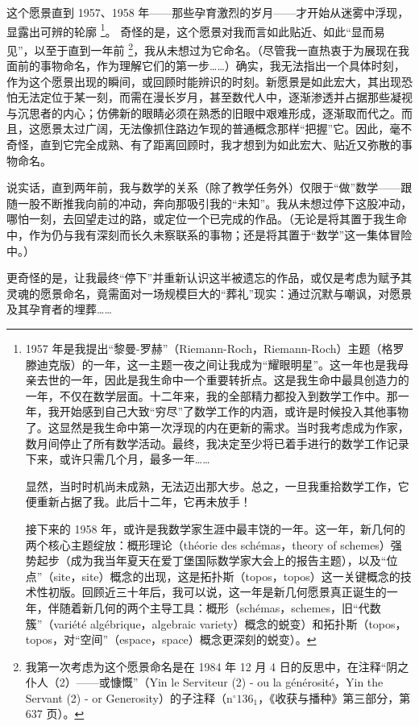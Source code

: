 这个愿景直到 1957、1958 年——那些孕育激烈的岁月——才开始从迷雾中浮现，显露出可辨的轮廓 \footnote{1957 年是我提出“黎曼-罗赫”（Riemann-Roch，Riemann-Roch）主题（格罗滕迪克版）的一年，这一主题一夜之间让我成为“耀眼明星”。这一年也是我母亲去世的一年，因此是我生命中一个重要转折点。这是我生命中最具创造力的一年，不仅在数学层面。十二年来，我的全部精力都投入到数学工作中。那一年，我开始感到自己大致“穷尽”了数学工作的内涵，或许是时候投入其他事物了。这显然是我生命中第一次浮现的内在更新的需求。当时我考虑成为作家，数月间停止了所有数学活动。最终，我决定至少将已着手进行的数学工作记录下来，或许只需几个月，最多一年……

显然，当时时机尚未成熟，无法迈出那大步。总之，一旦我重拾数学工作，它便重新占据了我。此后十二年，它再未放手！

接下来的 1958 年，或许是我数学家生涯中最丰饶的一年。这一年，新几何的两个核心主题绽放：概形理论（théorie des schémas，theory of schemes）强势起步（成为我当年夏天在爱丁堡国际数学家大会上的报告主题），以及“位点”（site，site）概念的出现，这是拓扑斯（topos，topos）这一关键概念的技术性初版。回顾近三十年后，我可以说，这一年是新几何愿景真正诞生的一年，伴随着新几何的两个主导工具：概形（schémas，schemes，旧“代数簇”（variété algébrique，algebraic variety）概念的蜕变）和拓扑斯（topos，topos，对“空间”（espace，space）概念更深刻的蜕变）。}。  
奇怪的是，这个愿景对我而言如此贴近、如此“显而易见”，以至于直到一年前 \footnote{我第一次考虑为这个愿景命名是在 1984 年 12 月 4 日的反思中，在注释“阴之仆人（2）——或慷慨”（Yin le Serviteur (2) - ou la générosité，Yin the Servant (2) - or Generosity）的子注释（$\mathrm{n}^{\circ} 136_{1}$，《收获与播种》第三部分，第 637 页）。}，我从未想过为它命名。（尽管我一直热衷于为展现在我面前的事物命名，作为理解它们的第一步……）确实，我无法指出一个具体时刻，作为这个愿景出现的瞬间，或回顾时能辨识的时刻。新愿景是如此宏大，其出现恐怕无法定位于某一刻，而需在漫长岁月，甚至数代人中，逐渐渗透并占据那些凝视与沉思者的内心；仿佛新的眼睛必须在熟悉的旧眼中艰难形成，逐渐取而代之。而且，这愿景太过广阔，无法像抓住路边乍现的普通概念那样“把握”它。因此，毫不奇怪，直到它完全成熟、有了距离回顾时，我才想到为如此宏大、贴近又弥散的事物命名。

说实话，直到两年前，我与数学的关系（除了教学任务外）仅限于“做”数学——跟随一股不断推我向前的冲动，奔向那吸引我的“未知”。我从未想过停下这股冲动，哪怕一刻，去回望走过的路，或定位一个已完成的作品。（无论是将其置于我生命中，作为仍与我有深刻而长久未察联系的事物；还是将其置于“数学”这一集体冒险中。）

更奇怪的是，让我最终“停下”并重新认识这半被遗忘的作品，或仅是考虑为赋予其灵魂的愿景命名，竟需面对一场规模巨大的“葬礼”现实：通过沉默与嘲讽，对愿景及其孕育者的埋葬……
